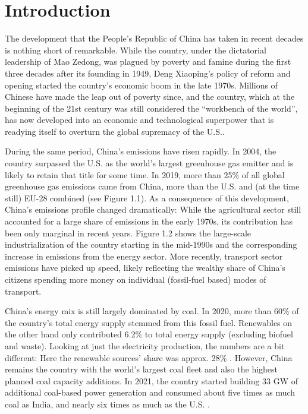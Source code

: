 \documentclass[
  12pt,
]{article}
\numberwithin{equation}{section}
\numberwithin{table}{section}
\numberwithin{figure}{section}
\begin{document}
\hypertarget{introduction}{%
\section{Introduction}\label{introduction}}

The development that the People's Republic of China has taken in recent
decades is nothing short of remarkable. While the country, under the
dictatorial leadership of Mao Zedong, was plagued by poverty and famine
during the first three decades after its founding in 1949, Deng
Xiaoping's policy of reform and opening started the country's economic
boom in the late 1970s. Millions of Chinese have made the leap out of
poverty since, and the country, which at the beginning of the 21st
century was still considered the ``workbench of the world'', has now
developed into an economic and technological superpower that is readying
itself to overturn the global supremacy of the U.S..

During the same period, China's emissions have risen rapidly. In 2004,
the country surpassed the U.S. as the world's largest greenhouse gas
emitter and is likely to retain that title for some time. In 2019, more
than 25\% of all global greenhouse gas emissions came from China, more
than the U.S. and (at the time still) EU-28 combined (see Figure 1.1).
As a consequence of this development, China's emissions profile changed
dramatically: While the agricultural sector still accounted for a large
share of emissions in the early 1970s, its contribution has been only
marginal in recent years. Figure 1.2 shows the large-scale
industrialization of the country starting in the mid-1990s and the
corresponding increase in emissions from the energy sector. More
recently, transport sector emissions have picked up speed, likely
reflecting the wealthy share of China's citizens spending more money on
individual (fossil-fuel based) modes of transport.

China's energy mix is still largely dominated by coal. In 2020, more
than 60\% of the country's total energy supply stemmed from this fossil
fuel. Renewables on the other hand only contributed 6.2\% to total
energy supply (excluding biofuel and waste). Looking at just the
electricity production, the numbers are a bit different: Here the
renewable sources' share was approx. 28\% \citep{IEA2022}. However,
China remains the country with the world's largest coal fleet and also
the highest planned coal capacity additions. In 2021, the country
started building 33 GW of additional coal-based power generation and
consumed about five times as much coal as India, and nearly six times as
much as the U.S. \citep{Green2022}.
\end{document}
